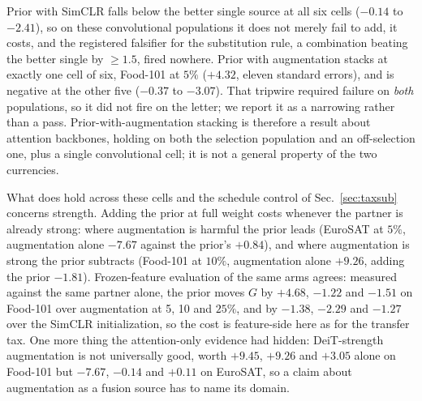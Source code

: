  Prior with SimCLR falls below the better single source at all six cells
($-0.14$ to $-2.41$), so on these convolutional populations it does not merely
fail to add, it costs, and the registered falsifier for the substitution rule,
a combination beating the better single by ${\geq}1.5$, fired nowhere. Prior
with augmentation stacks at exactly one cell of six, Food-101 at $5\%$
($+4.32$, eleven standard errors), and is negative at the other five ($-0.37$
to $-3.07$). That tripwire required failure on \emph{both} populations, so it
did not fire on the letter; we report it as a narrowing rather than a pass.
Prior-with-augmentation stacking is therefore a result about attention
backbones, holding on both the selection population and an off-selection one,
plus a single convolutional cell; it is not a general property of the two
currencies.

 What does hold across these cells and the schedule control of
Sec.~\ref{sec:taxsub} concerns strength. Adding the prior at full weight
costs whenever the partner is already strong: where augmentation is harmful the
prior leads (EuroSAT at $5\%$, augmentation alone $-7.67$ against the prior's
$+0.84$), and where augmentation is strong the prior subtracts (Food-101 at
$10\%$, augmentation alone $+9.26$, adding the prior $-1.81$). Frozen-feature
evaluation of the same arms agrees: measured against the same partner alone,
the prior moves $G$ by $+4.68$, $-1.22$ and $-1.51$ on Food-101 over
augmentation at 5, 10 and $25\%$, and by $-1.38$, $-2.29$ and $-1.27$ over the
SimCLR initialization, so the cost is feature-side here as for the transfer
tax. One more thing the attention-only evidence had hidden: DeiT-strength
augmentation is not universally good, worth $+9.45$, $+9.26$ and $+3.05$ alone
on Food-101 but $-7.67$, $-0.14$ and $+0.11$ on EuroSAT, so a claim about
augmentation as a fusion source has to name its domain.


